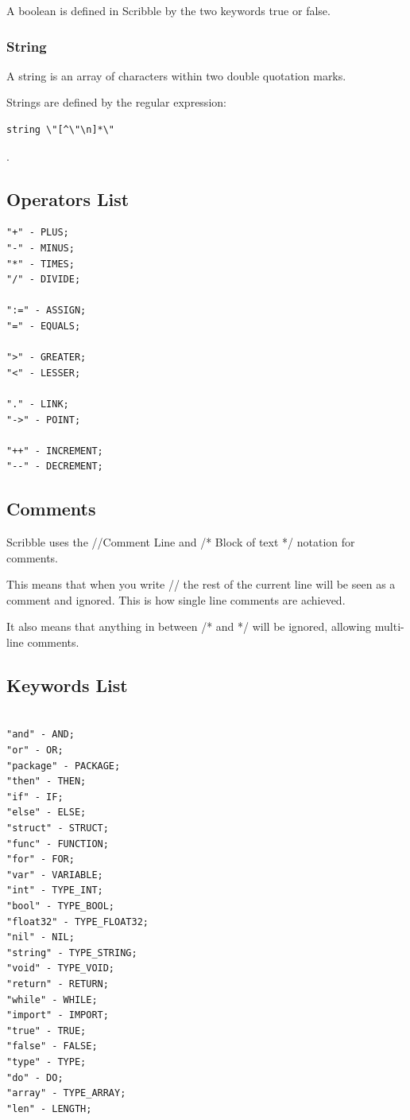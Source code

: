\documentclass[]{final_report}
\begin{document}
A boolean is defined in Scribble by the two keywords true or false.

\subsubsection{String}

A string is an array of characters within two double quotation marks. 

Strings are defined by the regular expression: \begin{verbatim}
string \"[^\"\n]*\"
\end{verbatim}.

\subsection{Operators List}

\begin{verbatim}
"+" - PLUS;
"-" - MINUS;
"*" - TIMES;
"/" - DIVIDE;

":=" - ASSIGN;
"=" - EQUALS;

">" - GREATER;
"<" - LESSER;

"." - LINK;
"->" - POINT;

"++" - INCREMENT;
"--" - DECREMENT;
\end{verbatim}

\subsection{Comments}

Scribble uses the //Comment Line and /* Block of text */ notation for comments. 

This means that when you write // the rest of the current line will be seen as a comment and ignored. This is how single line comments are achieved.

It also means that anything in between /* and */ will be ignored, allowing multi-line comments.

\subsection{Keywords List}

\begin{verbatim}

"and" - AND;
"or" - OR;
"package" - PACKAGE;
"then" - THEN;
"if" - IF;
"else" - ELSE;
"struct" - STRUCT;
"func" - FUNCTION;
"for" - FOR;
"var" - VARIABLE;
"int" - TYPE_INT;
"bool" - TYPE_BOOL;
"float32" - TYPE_FLOAT32;
"nil" - NIL;
"string" - TYPE_STRING;
"void" - TYPE_VOID;
"return" - RETURN;
"while" - WHILE;
"import" - IMPORT;
"true" - TRUE;
"false" - FALSE;
"type" - TYPE;
"do" - DO;
"array" - TYPE_ARRAY;
"len" - LENGTH;

\end{verbatim}
\end{document}
